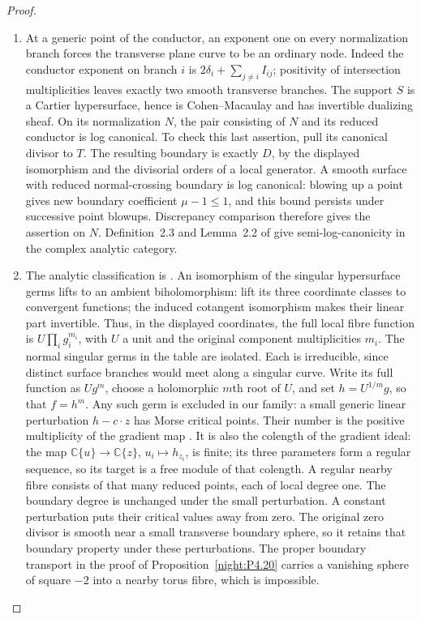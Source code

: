 \begin{proof}

\begin{enumerate}[label={$\langle1\rangle$\arabic*.},leftmargin=*]
\item At a generic point of the conductor, an exponent one on every normalization
branch forces the transverse plane curve to be an
ordinary node. Indeed the conductor exponent on
branch $i$ is
$2\delta_i+\sum_{j\ne i}I_{ij}$; positivity of
intersection multiplicities leaves exactly two
smooth transverse branches. The support $S$ is a
Cartier hypersurface, hence is Cohen--Macaulay and
has invertible dualizing sheaf. On its normalization $N$, the pair consisting of $N$
and its reduced conductor is log canonical.
To check this last assertion, pull its canonical
divisor to $T$. The resulting boundary is exactly
$D$, by the displayed isomorphism and the
divisorial orders of a local generator. A smooth
surface with reduced normal-crossing boundary is
log canonical: blowing up a point gives new
boundary coefficient $\mu-1\le1$, and this
bound persists under successive point blowups.
Discrepancy comparison therefore gives the
assertion on $N$. Definition~2.3 and Lemma~2.2 of
\cite[p.~189]{LiuRollenske2012SLC} give semi-log-canonicity in
the complex analytic category.

\item The analytic classification is
\cite[Theorem~1.1, p.~186; Table~1, p.~187;
Propositions~3.1 and~4.1, pp.~192--200]{LiuRollenske2012SLC}.
An isomorphism of the singular hypersurface germs lifts to an ambient
biholomorphism: lift its three coordinate classes to convergent functions;
the induced cotangent isomorphism makes their linear part invertible.
Thus, in the displayed coordinates, the full local fibre function is
$U\prod_i g_i^{m_i}$, with $U$ a unit and the original component
multiplicities $m_i$. The normal singular germs in the table are isolated.
Each is irreducible, since distinct surface branches would meet along
a singular curve. Write its full function as $Ug^m$, choose a holomorphic
$m$th root of $U$, and set $h=U^{1/m}g$, so that $f=h^m$. Any such germ is excluded
in our family: a small generic linear
perturbation $h-c\cdot z$ has Morse critical points.
Their number is the positive multiplicity of the gradient map
\cite[Appendix~B, Lemmas~B.1--B.3 and the positivity proof,
pp.~111--114]{Milnor1968}. It is also the colength of the gradient ideal:
the map $\mathbb C\{u\}\to\mathbb C\{z\}$,
$u_i\mapsto h_{z_i}$, is finite; its three parameters form a regular
sequence, so its target is a free module of that colength. A regular
nearby fibre consists of that many reduced points, each of local degree
one. The boundary degree is unchanged under the small perturbation. A constant perturbation
puts their critical values away from zero.
The original zero divisor is smooth near
a small transverse boundary sphere, so it
retains that boundary property under these
perturbations. The proper boundary
transport in the proof of Proposition~\ref{night:P4.20} carries a
vanishing sphere of square $-2$ into a
nearby torus fibre, which is impossible.


\end{enumerate}
\end{proof}
